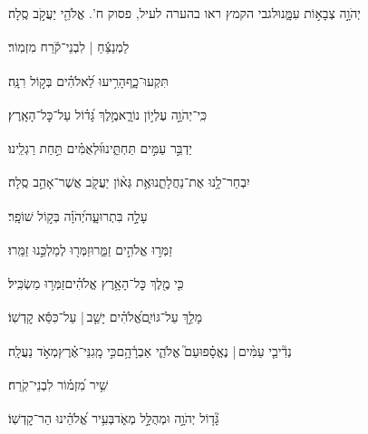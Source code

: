 \documentclass[12pt]{article}
\newcommand{\loc}[1]{\textsuperscript{\locf{#1}}}
\begin{document}
{\loc{ יב}~}‏יְהֹוָ֣ה צְבָא֣וֹת עִמָּ֑נוּ{\hfill}לגבי הקמץ ראו בהערה לעיל, פסוק ח'. אֱלֹהֵ֖י יַעֲקֹ֣ב סֶֽלָה׃\par\pend

\pstart[\subsection*{\textcolor{red}{פרק מז}}]\label{פרק מז}
{\loc{ א}~}‏לַמְנַצֵּ֬חַ | לִבְנֵי־קֹ֬רַח מִזְמֽוֹר׃\par

{\loc{ ב}~}‏ תִּקְעוּ־כָ֑ף{\hfill}הָרִ֥יעוּ לֵ֝אלֹהִ֗ים בְּק֣וֹל רִנָּֽה׃\par

{\loc{ ג}~}‏כִּֽי־יְהֹוָ֣ה עֶלְי֣וֹן נוֹרָ֑א{\hfill}מֶ֥לֶךְ גָּ֝ד֗וֹל עַל־כׇּל־הָאָֽרֶץ׃\par

{\loc{ ד}~}‏יַדְבֵּ֣ר עַמִּ֣ים תַּחְתֵּ֑ינוּ{\hfill}וּ֝לְאֻמִּ֗ים תַּ֣חַת רַגְלֵֽינוּ׃\par

{\loc{ ה}~}‏יִבְחַר־לָ֥נוּ אֶת־נַחֲלָתֵ֑נוּ{\hfill}אֶ֥ת גְּא֨וֹן יַעֲקֹ֖ב אֲשֶׁר־אָהֵ֣ב סֶֽלָה׃\par

{\loc{ ו}~}‏עָלָ֣ה  בִּתְרוּעָ֑ה{\hfill}יְ֝הֹוָ֗ה בְּק֣וֹל שׁוֹפָֽר׃\par

{\loc{ ז}~}‏זַמְּר֣וּ אֱלֹהִ֣ים זַמֵּ֑רוּ{\hfill}זַמְּר֖וּ לְמַלְכֵּ֣נוּ זַמֵּֽרוּ׃\par

{\loc{ ח}~}‏כִּ֤י מֶ֖לֶךְ כׇּל־הָאָ֥רֶץ אֱלֹהִ֗ים{\hfill}זַמְּר֥וּ מַשְׂכִּֽיל׃\par

{\loc{ ט}~}‏מָלַ֣ךְ  עַל־גּוֹיִ֑ם{\hfill}אֱ֝לֹהִ֗ים יָשַׁ֤ב |  עַל־כִּסֵּ֬א קׇדְשֽׁוֹ׃\par

{\loc{ י}~}‏נְדִ֘יבֵ֤י עַמִּ֨ים |  נֶאֱסָ֗פוּ{\hfill}עַם֮ אֱלֹהֵ֢י אַבְרָ֫הָ֥ם\newline\hspace*{.5em}כִּ֣י  מָֽגִנֵּי־אֶ֗רֶץ{\hfill}מְאֹ֣ד נַעֲלָֽה׃\par\pend
\ledpb
\pstart[\subsection*{\textcolor{red}{פרק מח}}]\label{פרק מח}
{\loc{ א}~}‏שִׁ֥יר מִ֝זְמ֗וֹר לִבְנֵי־קֹֽרַח׃\par

{\loc{ ב}~}‏גָּ֘ד֤וֹל יְהֹוָ֣ה וּמְהֻלָּ֣ל מְאֹ֑ד{\hfill}בְּעִ֥יר אֱ֝לֹהֵ֗ינוּ הַר־קׇדְשֽׁוֹ׃\par
\end{document}
